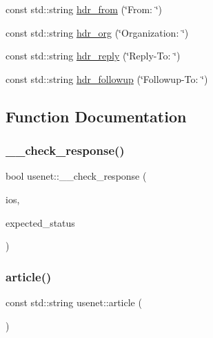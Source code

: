 \begin{DoxyCompactItemize}
\item 
const std\+::string \hyperlink{namespaceusenet_a83de6af786c35f4d5b783fddbe72172d}{hdr\+\_\+from} (\char`\"{}From\+: \char`\"{})
\item 
const std\+::string \hyperlink{namespaceusenet_ae6f7fa93e8a59231c96161a68fd9bb84}{hdr\+\_\+org} (\char`\"{}Organization\+: \char`\"{})
\item 
const std\+::string \hyperlink{namespaceusenet_a1e3efa9640d1a83e9bb71408528eb248}{hdr\+\_\+reply} (\char`\"{}Reply-\/To\+: \char`\"{})
\item 
const std\+::string \hyperlink{namespaceusenet_a8694574881407155e03162c163b5c99f}{hdr\+\_\+followup} (\char`\"{}Followup-\/To\+: \char`\"{})
\end{DoxyCompactItemize}


\subsection{Function Documentation}
\hypertarget{namespaceusenet_a3880af028008eb3419757afa4a932e48}{}\label{namespaceusenet_a3880af028008eb3419757afa4a932e48} 
\subsubsection{\texorpdfstring{\+\_\+\+\_\+check\+\_\+response()}{\_\_check\_response()}}
{\footnotesize\ttfamily bool usenet\+::\+\_\+\+\_\+check\+\_\+response (\begin{DoxyParamCaption}\item[{std\+::basic\+\_\+iostream$<$ char $>$ \&}]{ios,  }\item[{Response\+Status}]{expected\+\_\+status }\end{DoxyParamCaption})\hspace{0.3cm}{\ttfamily [inline]}}

\hypertarget{namespaceusenet_acd3d57602585fa5d2637f2fe850ab11f}{}\label{namespaceusenet_acd3d57602585fa5d2637f2fe850ab11f} 
\subsubsection{\texorpdfstring{article()}{article()}}
{\footnotesize\ttfamily const std\+::string usenet\+::article (\begin{DoxyParamCaption}\item[{\char`\"{}A\+R\+T\+I\+C\+LE \char`\"{}}]{ }\end{DoxyParamCaption})}

